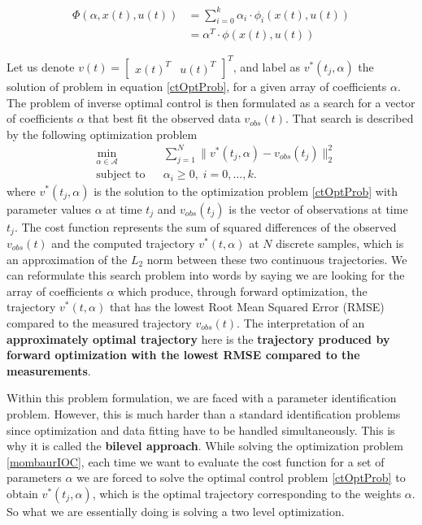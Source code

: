 \documentclass[12pt, a4paper]{article}
\newcommand{\norm}[1]{\lVert#1\rVert_2}         %
\begin{document}
\begin{equation} \label{ctBasisFun}
\begin{split}
    \Phi(\alpha, x(t), u(t)) &= \sum_{i=0}^k \alpha_i \cdot \phi_i(x(t), u(t)) \\
                             &= \alpha^T \cdot \phi(x(t), u(t))
\end{split}
\end{equation}\par
Let us denote \( v(t) = \begin{bmatrix}
x(t)^T & u(t)^T 
\end{bmatrix}^T\), and label as $v^*(t_j, \alpha)$ the solution of problem in equation \eqref{ctOptProb}, for a given array of coefficients $\alpha$. The problem of inverse optimal control is then formulated as a search for a vector of coefficients \( \alpha \) that best fit the observed data $v_{obs}(t)$. That search is described by the following optimization problem
\begin{equation} \label{mombaurIOC}
\begin{aligned}
&\min_{\alpha \in \mathcal{A}} & &\sum_{j=1}^N \norm{v^*(t_j, \alpha) - v_{obs}(t_j)}^2 \\
&\text{subject to}                  & &\alpha_i \geq 0, \; i = 0, \ldots, k.
\end{aligned}
\end{equation}
where \( v^*(t_j, \alpha) \) is the solution to the optimization problem \eqref{ctOptProb} with parameter values \( \alpha\) at time \( t_j\) and \(v_{obs}(t_j) \) is the vector of observations at time \( t_j\). The cost function represents the sum of squared differences of the observed $v_{obs}(t)$ and the computed trajectory $v^*(t, \alpha)$ at \( N\) discrete samples, which is an approximation of the \( L_2\) norm between these two continuous trajectories. We can reformulate  this search problem into words by saying we are looking for the array of coefficients $\alpha$ which produce, through forward optimization, the trajectory $v^*(t, \alpha)$ that has the lowest Root Mean Squared Error (RMSE) compared to the measured trajectory $v_{obs}(t)$. The interpretation of an \textbf{approximately optimal trajectory} here is the \textbf{trajectory produced by forward optimization with the lowest RMSE compared to the measurements}. \par
Within this problem formulation, we are faced with a parameter identification problem. However, this is much harder than a standard identification problems since optimization and data fitting have to be handled simultaneously. This is why it is called the \textbf{bilevel approach}. While solving the optimization problem \eqref{mombaurIOC}, each time we want to evaluate the cost function for a set of parameters \( \alpha\) we are forced to solve the optimal control problem \eqref{ctOptProb} to obtain \( v^*(t_j, \alpha) \), which is the optimal trajectory corresponding to the weights \( \alpha \). So what we are essentially doing is solving a two level optimization.\par
\end{document}
